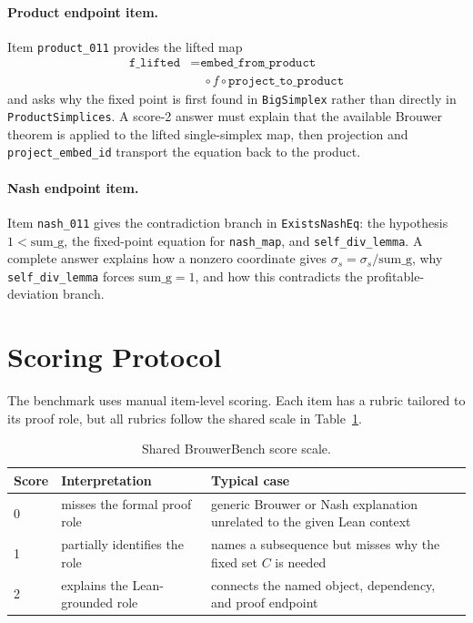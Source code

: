 \documentclass{article}
\theoremstyle{definition}
\begin{document}
\paragraph{Product endpoint item.}
Item \texttt{product\_011} provides the lifted map
\[
\begin{aligned}
\texttt{f\_lifted}
&=
\texttt{embed\_from\_product} \\
&\quad \circ f \circ \texttt{project\_to\_product}
\end{aligned}
\]
and asks why the fixed point is first found in \texttt{BigSimplex} rather than directly in \texttt{ProductSimplices}. A score-2 answer must explain that the available Brouwer theorem is applied to the lifted single-simplex map, then projection and \texttt{project\_embed\_id} transport the equation back to the product.

\paragraph{Nash endpoint item.}
Item \texttt{nash\_011} gives the contradiction branch in \texttt{ExistsNashEq}: the hypothesis \(1<\mathrm{sum\_g}\), the fixed-point equation for \texttt{nash\_map}, and \texttt{self\_div\_lemma}. A complete answer explains how a nonzero coordinate gives \(\sigma_s=\sigma_s/\mathrm{sum\_g}\), why \texttt{self\_div\_lemma} forces \(\mathrm{sum\_g}=1\), and how this contradicts the profitable-deviation branch.

\section{Scoring Protocol}
\label{app:scoring}

The benchmark uses manual item-level scoring. Each item has a rubric tailored to its proof role, but all rubrics follow the shared scale in Table~\ref{tab:appendix-score-scale}.

\begin{table}[H]
\caption{Shared BrouwerBench score scale.}
\label{tab:appendix-score-scale}
\begin{center}
    \begin{small}
      \begin{tabular}{lll}
\toprule
Score & Interpretation & Typical case \\
\midrule
0 & misses the formal proof role & generic Brouwer or Nash explanation unrelated to the given Lean context \\
1 & partially identifies the role & names a subsequence but misses why the fixed set \(C\) is needed \\
2 & explains the Lean-grounded role & connects the named object, dependency, and proof endpoint \\
\bottomrule
\end{tabular}
    \end{small}
  \end{center}
  \vskip -0.1in
\end{table}
\end{document}
